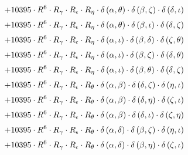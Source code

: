 \begin{subequations}
\begin{gather}
 \\[0.2em] \notag 		 + 10395 \cdot R^{6} \cdot R_{\gamma{}} \cdot R_{\epsilon{}} \cdot R_{\eta{}} \cdot \delta{}\left(\alpha{}, \theta{}\right) \cdot \delta{}\left(\beta{}, \zeta{}\right) \cdot \delta{}\left(\delta{}, \iota{}\right) 
 \\[0.2em] \notag 		 + 10395 \cdot R^{6} \cdot R_{\gamma{}} \cdot R_{\epsilon{}} \cdot R_{\eta{}} \cdot \delta{}\left(\alpha{}, \theta{}\right) \cdot \delta{}\left(\beta{}, \iota{}\right) \cdot \delta{}\left(\delta{}, \zeta{}\right) 
 \\[0.2em] \notag 		 + 10395 \cdot R^{6} \cdot R_{\gamma{}} \cdot R_{\epsilon{}} \cdot R_{\eta{}} \cdot \delta{}\left(\alpha{}, \iota{}\right) \cdot \delta{}\left(\beta{}, \delta{}\right) \cdot \delta{}\left(\zeta{}, \theta{}\right) 
 \\[0.2em] \notag 		 + 10395 \cdot R^{6} \cdot R_{\gamma{}} \cdot R_{\epsilon{}} \cdot R_{\eta{}} \cdot \delta{}\left(\alpha{}, \iota{}\right) \cdot \delta{}\left(\beta{}, \zeta{}\right) \cdot \delta{}\left(\delta{}, \theta{}\right) 
 \\[0.2em] \notag 		 + 10395 \cdot R^{6} \cdot R_{\gamma{}} \cdot R_{\epsilon{}} \cdot R_{\eta{}} \cdot \delta{}\left(\alpha{}, \iota{}\right) \cdot \delta{}\left(\beta{}, \theta{}\right) \cdot \delta{}\left(\delta{}, \zeta{}\right) 
 \\[0.2em] \notag 		 + 10395 \cdot R^{6} \cdot R_{\gamma{}} \cdot R_{\epsilon{}} \cdot R_{\theta{}} \cdot \delta{}\left(\alpha{}, \beta{}\right) \cdot \delta{}\left(\delta{}, \zeta{}\right) \cdot \delta{}\left(\eta{}, \iota{}\right) 
 \\[0.2em] \notag 		 + 10395 \cdot R^{6} \cdot R_{\gamma{}} \cdot R_{\epsilon{}} \cdot R_{\theta{}} \cdot \delta{}\left(\alpha{}, \beta{}\right) \cdot \delta{}\left(\delta{}, \eta{}\right) \cdot \delta{}\left(\zeta{}, \iota{}\right) 
 \\[0.2em] \notag 		 + 10395 \cdot R^{6} \cdot R_{\gamma{}} \cdot R_{\epsilon{}} \cdot R_{\theta{}} \cdot \delta{}\left(\alpha{}, \beta{}\right) \cdot \delta{}\left(\delta{}, \iota{}\right) \cdot \delta{}\left(\zeta{}, \eta{}\right) 
 \\[0.2em] \notag 		 + 10395 \cdot R^{6} \cdot R_{\gamma{}} \cdot R_{\epsilon{}} \cdot R_{\theta{}} \cdot \delta{}\left(\alpha{}, \delta{}\right) \cdot \delta{}\left(\beta{}, \zeta{}\right) \cdot \delta{}\left(\eta{}, \iota{}\right) 
 \\[0.2em] \notag 		 + 10395 \cdot R^{6} \cdot R_{\gamma{}} \cdot R_{\epsilon{}} \cdot R_{\theta{}} \cdot \delta{}\left(\alpha{}, \delta{}\right) \cdot \delta{}\left(\beta{}, \eta{}\right) \cdot \delta{}\left(\zeta{}, \iota{}\right) 

\end{gather}
\end{subequations}
